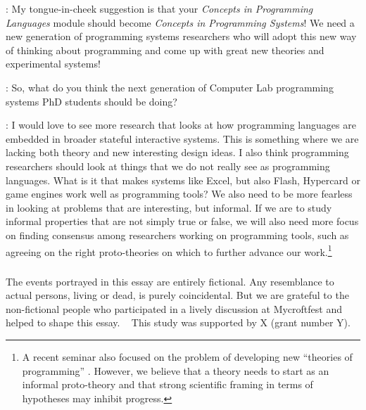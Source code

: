 \documentclass[runningheads]{llncs}
\newcommand{\T}{Tomas}
\newcommand{\J}{Joel}
\newcommand{\says}[2][gg]{\vspace{0.5em}\noindent\hangindent=0.5cm{\textsc{#1}}: #2}
\begin{document}
\says[\T]{My tongue-in-cheek suggestion is that your
\emph{Concepts in Programming Languages} module should become
\emph{Concepts in Programming Systems}! We need a new generation of programming systems researchers who will adopt this new way of thinking about programming and come up with great new theories and experimental systems!}

\says[Alan]{So, what do you think the next generation of Computer Lab programming systems PhD students should be doing?}

\says[\J]{I would love to see more research that looks at how programming languages are embedded in broader stateful interactive systems. This is something where we are lacking both theory and new interesting design ideas. I also think programming researchers should look at things that we do not really see as programming languages. What is it that makes systems like Excel, but also Flash, Hypercard or game engines work well as programming tools? We also need to be more fearless in looking at problems that are interesting, but informal. If we are to study informal properties that are not simply true or false, we will also need more focus on finding consensus among researchers working on programming tools, such as agreeing on the right proto-theories on which to further advance our work.\footnote{A recent seminar also focused on the problem of developing new ``theories of programming'' \cite{latoza-2023-theories}. However, we believe that a theory needs to start as an informal proto-theory and that strong scientific framing in terms of hypotheses may inhibit progress.}}

\begin{credits}
\subsubsection{\ackname}
The events portrayed in this essay are entirely fictional. Any resemblance to actual persons, living or dead, is purely coincidental. But we are grateful to the non-fictional people who participated in a lively discussion at Mycroftfest and helped to shape this essay.
~
This study was supported by X (grant number Y).
\end{credits}



\end{document}

